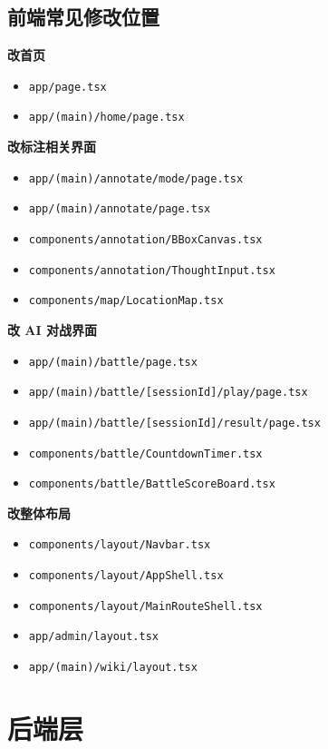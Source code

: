 \documentclass[11pt,a4paper]{ctexart}
\begin{document}
\subsection{前端常见修改位置}

\textbf{改首页}

\begin{itemize}
  \item \texttt{app/page.tsx}
  \item \texttt{app/(main)/home/page.tsx}
\end{itemize}

\textbf{改标注相关界面}

\begin{itemize}
  \item \texttt{app/(main)/annotate/mode/page.tsx}
  \item \texttt{app/(main)/annotate/page.tsx}
  \item \texttt{components/annotation/BBoxCanvas.tsx}
  \item \texttt{components/annotation/ThoughtInput.tsx}
  \item \texttt{components/map/LocationMap.tsx}
\end{itemize}

\textbf{改 AI 对战界面}

\begin{itemize}
  \item \texttt{app/(main)/battle/page.tsx}
  \item \texttt{app/(main)/battle/[sessionId]/play/page.tsx}
  \item \texttt{app/(main)/battle/[sessionId]/result/page.tsx}
  \item \texttt{components/battle/CountdownTimer.tsx}
  \item \texttt{components/battle/BattleScoreBoard.tsx}
\end{itemize}

\textbf{改整体布局}

\begin{itemize}
  \item \texttt{components/layout/Navbar.tsx}
  \item \texttt{components/layout/AppShell.tsx}
  \item \texttt{components/layout/MainRouteShell.tsx}
  \item \texttt{app/admin/layout.tsx}
  \item \texttt{app/(main)/wiki/layout.tsx}
\end{itemize}

\section{后端层}
\end{document}
